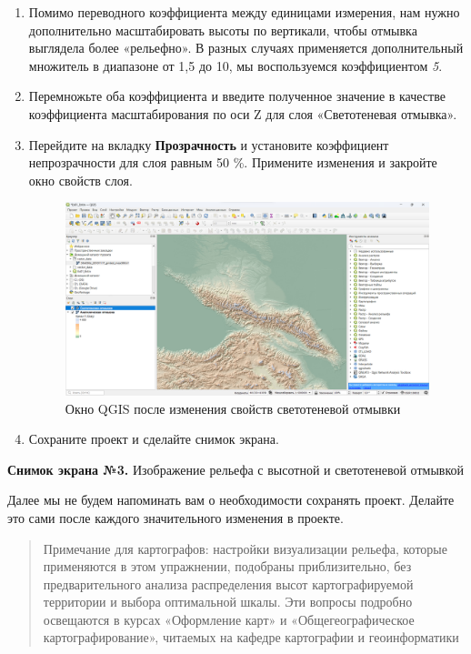 \documentclass[
  12pt,
]{book}
\begin{document}
\begin{enumerate}
\def\labelenumi{\arabic{enumi}.}
\setcounter{enumi}{11}
\item
  Помимо переводного коэффициента между единицами измерения, нам нужно дополнительно масштабировать высоты по вертикали, чтобы отмывка выглядела более «рельефно». В разных случаях применяется дополнительный множитель в диапазоне от 1,5 до 10, мы воспользуемся коэффициентом \emph{5}.
\item
  Перемножьте оба коэффициента и введите полученное значение в качестве коэффициента масштабирования по оси Z для слоя «Светотеневая отмывка».
\item
  Перейдите на вкладку \textbf{Прозрачность} и установите коэффициент непрозрачности для слоя равным 50 \%. Примените изменения и закройте окно свойств слоя.

  \begin{figure}
  \centering
  \includegraphics{images/Ex01_MapGeneral/screen3.png}
  \caption{Окно QGIS после изменения свойств светотеневой отмывки}
  \end{figure}
\item
  Сохраните проект и сделайте снимок экрана.
\end{enumerate}

\textbf{Снимок экрана №3.} Изображение рельефа с высотной и светотеневой отмывкой

Далее мы не будем напоминать вам о необходимости сохранять проект. Делайте это сами после каждого значительного изменения в проекте.

\begin{quote}
Примечание для картографов: настройки визуализации рельефа, которые применяются в этом упражнении, подобраны приблизительно, без предварительного анализа распределения высот картографируемой территории и выбора оптимальной шкалы. Эти вопросы подробно освещаются в курсах «Оформление карт» и «Общегеографическое картографирование», читаемых на кафедре картографии и геоинформатики
\end{quote}
\end{document}
